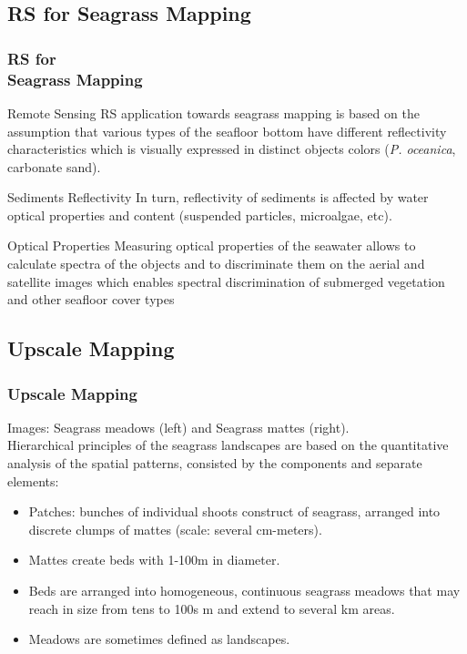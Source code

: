 \documentclass[pdflatex,compress,9pt,
	xcolor={dvipsnames,dvipsnames,svgnames,x11names,table},
	hyperref={colorlinks = true,breaklinks = true, urlcolor = NavyBlue, breaklinks = true}]{beamer}
\begin{document}
\subsection{RS for Seagrass Mapping}
\begin{frame}\frametitle{RS for \\Seagrass Mapping}

\begin{alertblock}{Remote Sensing}
\ac{RS} application towards seagrass mapping is based on the assumption that various types of the seafloor bottom have different reflectivity characteristics which is visually expressed in distinct objects colors (\emph{P. oceanica}, carbonate sand).
\end{alertblock}

\begin{block}{Sediments Reflectivity}
In turn, reflectivity of sediments is affected by water optical properties and content (suspended particles, microalgae, etc).
\end{block}

\begin{block}{Optical Properties}
Measuring optical properties of the seawater allows to calculate spectra of the objects and to discriminate them on the aerial and satellite images which enables spectral discrimination of submerged vegetation and other seafloor cover types
\end{block}

\end{frame}

\subsection{Upscale Mapping}
\begin{frame}\frametitle{Upscale Mapping}
\begin{figure}[H]
	\centering
			\hspace{1mm}
\end{figure}
\small{Images: Seagrass meadows (left) and Seagrass mattes (right). \\
Hierarchical principles of the seagrass landscapes are based on the quantitative analysis of the spatial patterns, consisted by the components and separate elements:
\begin{itemize}
	\item \alert{Patches}: bunches of individual shoots construct of seagrass, arranged into discrete clumps of mattes (scale: several cm-meters).
	\item \alert{Mattes} create beds with 1-100m in diameter.
	\item \alert{Beds} are arranged into homogeneous, continuous seagrass meadows that may reach in size from tens to 100s m and extend to several km areas.
	\item \alert{Meadows} are sometimes defined as landscapes.
\end{itemize}
}
\end{frame}
\end{document}
